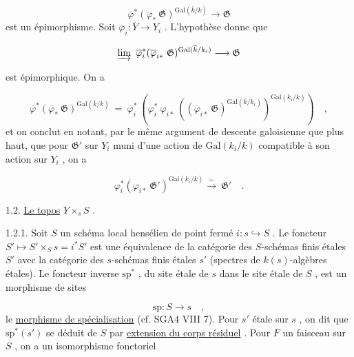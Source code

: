 \begin{equation*}
\overline{\varphi}^*(\overline{\varphi}_* \ \mathfrak{G})^{\mathrm{Gal}(\overline{k}/k)} \longrightarrow \mathfrak{G}
\end{equation*}
est un épimorphisme. Soit $\overline{\varphi}_i : \overline{Y} \to Y_i$ . L'hypothèse donne que

\begin{equation*}
\varinjlim \ \overline{\varphi}_i^*(\overline{\varphi}_{i*} \ \mathfrak{G})^{\mathrm{Gal}(\overline{k}/k_i)} \longrightarrow \mathfrak{G} 
\end{equation*}


 est épimorphique. On a

\begin{equation*}
\overline{\varphi}^*(\overline{\varphi}_* \ \mathfrak{G})^{\mathrm{Gal}(\overline{k}/k)} \ = \ \overline{\varphi}_i^* \ (\varphi_i^* \ \varphi_{i*} \ ((\overline{\varphi}_{i*} \ \mathfrak{G})^{\mathrm{Gal}(\overline{k}/k_i)})^{\mathrm{Gal}(k_i/k)}) \quad ,
\end{equation*}
et on conclut en notant, par le même argument de descente galoisienne que plus haut, que pour $\mathfrak{G}'$ sur $Y_i$ muni d'une action de $\mathrm{Gal}(k_i/k)$ compatible à son action sur $Y_i$ , on a

\begin{equation*}
\varphi_i^*(\varphi_{i*} \ \mathfrak{G}')^{\mathrm{Gal}(k_i/k)} \overset{\sim}{\longrightarrow} \ \mathfrak{G}' \quad .
\end{equation*}

1.2. \underline{Le topos} $Y \times_s S$ .

1.2.1. Soit $S$ un schéma local hensélien de point fermé $i : s \hookrightarrow S$ . Le foncteur $S' \longmapsto S' \times_S s = i^* S'$ est une équivalence de la catégorie des $S$-schémas finis étales $S'$ avec la catégorie des $s$-schémas finis étales $s'$ (spectres de $k(s)$-algèbres étales). Le foncteur inverse $\mathrm{sp}^*$ , du site étale de $s$ dans le site étale de $S$ , est un morphisme de sites

\begin{equation*}
\mathrm{sp} : S \longrightarrow s \quad ,
\end{equation*}
le \underline{morphisme de spécialisation} (cf. SGA4 VIII 7). Pour $s'$ étale sur $s$ , on dit que $\mathrm{sp}^*(s')$ se déduit de $S$ par \underline{extension du corps résiduel} . Pour $F$ un faisceau sur $S$ , on a un isomorphisme fonctoriel

